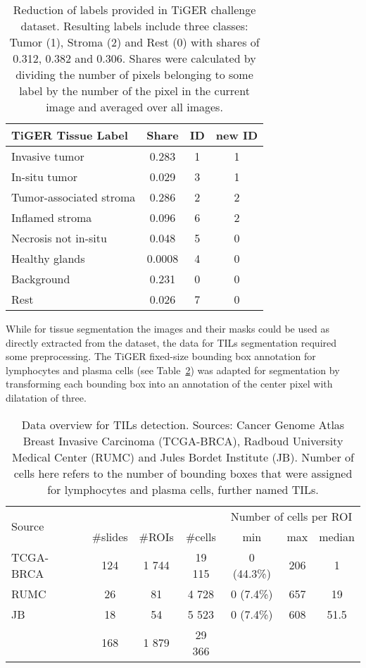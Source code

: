 \begin{table}[h!]
\centering
\begin{tabular}{ l c c c } 
\hline
TiGER Tissue Label & Share & ID & new ID  \\ 
\hline
Invasive tumor & 0.283 & 1 & 1 \\ 
In-situ tumor & 0.029 & 3 & 1 \\ 
Tumor-associated stroma & 0.286 & 2 & 2\\
Inflamed stroma & 0.096 & 6 & 2\\
Necrosis not in-situ & 0.048 & 5 & 0\\
Healthy glands & 0.0008 & 4 & 0 \\ 
Background & 0.231 & 0 & 0 \\ 
Rest & 0.026 & 7 & 0\\
\hline
\end{tabular}
\caption{\label{tab:label_data} Reduction of labels provided in TiGER challenge dataset. Resulting labels include three classes: Tumor (1), Stroma (2) and Rest (0) with shares of 0.312, 0.382 and 0.306. Shares were calculated by dividing
the number of pixels belonging to some label by the number of the pixel in the current image and averaged over all images. }
\end{table}

While for tissue segmentation the images and their masks could be used as directly extracted from the 
dataset, the data for TILs segmentation required some preprocessing. The TiGER fixed-size bounding box
annotation for lymphocytes and plasma cells (see Table~\ref*{tab:tils_data}) was adapted for segmentation by transforming each
bounding box into an annotation of the center pixel with dilatation of three.
\begin{table}[h!]
\centering
\begin{tabular}{ l c c c c c c } 
\hline
\multirow{2}{*}{Source} & & & & \multicolumn{3}{c}{Number of cells per ROI}\\ 
\cline{2-7}
 & \#slides & \#ROIs & \#cells & min & max & median \\ 
\hline
TCGA-BRCA & 124 & 1 744 & 19 115 & 0 (44.3\%) & 206 & 1\\ 
RUMC & 26 & 81 & 4 728 & 0 (7.4\%) & 657 & 19\\ 
JB & 18 & 54 & 5 523 & 0 (7.4\%) & 608 & 51.5\\
\hline
 & 168 & 1 879 & 29 366 & & &\\
\end{tabular}
\caption{\label{tab:tils_data} Data overview for TILs detection. Sources: Cancer Genome Atlas Breast Invasive Carcinoma (TCGA-BRCA),
Radboud University Medical Center (RUMC) and Jules Bordet Institute (JB). Number of cells here refers to the number of
bounding boxes that were assigned for lymphocytes and plasma cells, further named TILs.}
\end{table}

